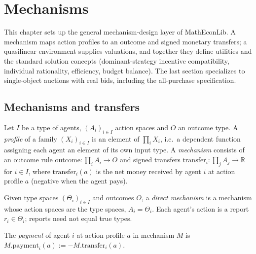 \chapter{Mechanisms}

This chapter sets up the general mechanism-design layer of MathEconLib. A mechanism maps action profiles to an outcome and signed monetary transfers; a quasilinear environment supplies valuations, and together they define utilities and the standard solution concepts (dominant-strategy incentive compatibility, individual rationality, efficiency, budget balance). The last section specializes to single-object auctions with real bids, including the all-purchase specification.

\section{Mechanisms and transfers}

\begin{definition}\label{def:MathEconLib.Mechanism}\leanok
Let $I$ be a type of agents, $(A_i)_{i\in I}$ action spaces and $O$ an outcome type. A \emph{profile} of a family $(X_i)_{i\in I}$ is an element of $\prod_i X_i$, i.e.\ a dependent function assigning each agent an element of its own input type. A \emph{mechanism} consists of an outcome rule $\mathrm{outcome}:\prod_i A_i\to O$ and signed transfers $\mathrm{transfer}_i:\prod_j A_j\to\mathbb{R}$ for $i\in I$, where $\mathrm{transfer}_i(a)$ is the net money received by agent $i$ at action profile $a$ (negative when the agent pays).
\end{definition}

\begin{definition}\label{def:MathEconLib.Mechanism.DirectMechanism}\leanok
{}
Given type spaces $(\Theta_i)_{i\in I}$ and outcomes $O$, a \emph{direct mechanism} is a mechanism whose action spaces are the type spaces, $A_i=\Theta_i$. Each agent's action is a report $r_i\in\Theta_i$; reports need not equal true types.
\end{definition}

\begin{definition}\label{def:MathEconLib.Mechanism.payment}\leanok
{}
The \emph{payment} of agent $i$ at action profile $a$ in mechanism $M$ is $M.\mathrm{payment}_i(a):=-M.\mathrm{transfer}_i(a)$.
\end{definition}

